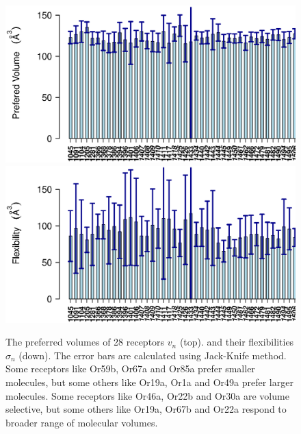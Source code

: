 \documentclass[11pt]{paper} %
\newcommand{\numberofreceptors}{ 28 }
\begin{document}
\begin{figure}
		\centering
		\includegraphics[width=  1 \textwidth]{mean-vol}
		\includegraphics[width=  1 \textwidth]{std-vol}
	\caption{The preferred volumes of \numberofreceptors receptors $v_n$ (top). 
		and their flexibilities $\sigma_n$ (down). 
		The error bars are calculated using Jack-Knife method. 
		Some receptors like Or59b, Or67a and  Or85a prefer smaller molecules, 
		but some others like Or19a,  Or1a and  Or49a prefer larger molecules.
		Some receptors like Or46a,  Or22b and Or30a are volume  selective, 
		but some others like Or19a,  Or67b and  Or22a respond to broader range of molecular volumes.
		}
		\label{fig:preferred_volume}
		\label{fig:volume_flexibility}
\end{figure}
 
\end{document}
